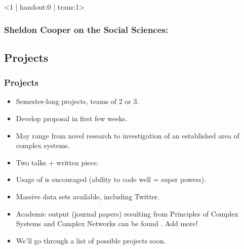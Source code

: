 \begin{frame}<1 | handout:0 | trans:1>
  
\frametitle{Sheldon Cooper on the Social Sciences:}



\end{frame}



\subsection{Projects}
\begin{frame}
  \frametitle{Projects}

  \begin{block}{}
  \begin{itemize}
  \item<+->
    Semester-long projects, teams of 2 or 3.
  \item<+-> 
    Develop proposal in first few weeks.
  \item<+-> 
    May range from novel research to investigation of an established area of complex systems.
  \item<+-> 
    Two talks + written piece.
  \item<+->
    Usage of 
    is encouraged (ability to code well = super powers).
  \item<+->
    Massive data sets available, including Twitter.
  \item<+->
    Academic output (journal papers) resulting from Principles
    of Complex Systems and Complex Networks can be found
    .  Add more!
  \item<+->
    We'll go through a list of possible projects soon.
  \end{itemize}
  \end{block}

\end{frame}

